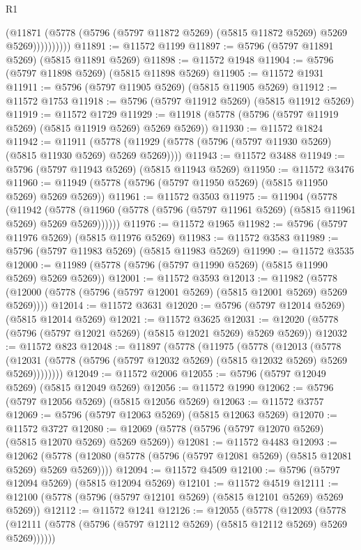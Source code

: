 \begin{lexlean}{R1}
\begin{coremodule}
                  (@11871
                    (@5778 (@5796 (@5797 @11872 @5269) (@5815 @11872 @5269) @5269 @5269))))))))))
@11891 := @11572 @1199
@11897 := @5796 (@5797 @11891 @5269) (@5815 @11891 @5269)
@11898 := @11572 @1948
@11904 := @5796 (@5797 @11898 @5269) (@5815 @11898 @5269)
@11905 := @11572 @1931
@11911 := @5796 (@5797 @11905 @5269) (@5815 @11905 @5269)
@11912 := @11572 @1753
@11918 := @5796 (@5797 @11912 @5269) (@5815 @11912 @5269)
@11919 := @11572 @1729
@11929 := @11918 (@5778 (@5796 (@5797 @11919 @5269) (@5815 @11919 @5269) @5269 @5269))
@11930 := @11572 @1824
@11942 := @11911
    (@5778 (@11929 (@5778 (@5796 (@5797 @11930 @5269) (@5815 @11930 @5269) @5269 @5269))))
@11943 := @11572 @3488
@11949 := @5796 (@5797 @11943 @5269) (@5815 @11943 @5269)
@11950 := @11572 @3476
@11960 := @11949 (@5778 (@5796 (@5797 @11950 @5269) (@5815 @11950 @5269) @5269 @5269))
@11961 := @11572 @3503
@11975 := @11904
    (@5778
      (@11942
        (@5778 (@11960 (@5778 (@5796 (@5797 @11961 @5269) (@5815 @11961 @5269) @5269 @5269))))))
@11976 := @11572 @1965
@11982 := @5796 (@5797 @11976 @5269) (@5815 @11976 @5269)
@11983 := @11572 @3583
@11989 := @5796 (@5797 @11983 @5269) (@5815 @11983 @5269)
@11990 := @11572 @3535
@12000 := @11989 (@5778 (@5796 (@5797 @11990 @5269) (@5815 @11990 @5269) @5269 @5269))
@12001 := @11572 @3593
@12013 := @11982
    (@5778 (@12000 (@5778 (@5796 (@5797 @12001 @5269) (@5815 @12001 @5269) @5269 @5269))))
@12014 := @11572 @3631
@12020 := @5796 (@5797 @12014 @5269) (@5815 @12014 @5269)
@12021 := @11572 @3625
@12031 := @12020 (@5778 (@5796 (@5797 @12021 @5269) (@5815 @12021 @5269) @5269 @5269))
@12032 := @11572 @823
@12048 := @11897
    (@5778
      (@11975
        (@5778
          (@12013
            (@5778
              (@12031 (@5778 (@5796 (@5797 @12032 @5269) (@5815 @12032 @5269) @5269 @5269))))))))
@12049 := @11572 @2006
@12055 := @5796 (@5797 @12049 @5269) (@5815 @12049 @5269)
@12056 := @11572 @1990
@12062 := @5796 (@5797 @12056 @5269) (@5815 @12056 @5269)
@12063 := @11572 @3757
@12069 := @5796 (@5797 @12063 @5269) (@5815 @12063 @5269)
@12070 := @11572 @3727
@12080 := @12069 (@5778 (@5796 (@5797 @12070 @5269) (@5815 @12070 @5269) @5269 @5269))
@12081 := @11572 @4483
@12093 := @12062
    (@5778 (@12080 (@5778 (@5796 (@5797 @12081 @5269) (@5815 @12081 @5269) @5269 @5269))))
@12094 := @11572 @4509
@12100 := @5796 (@5797 @12094 @5269) (@5815 @12094 @5269)
@12101 := @11572 @4519
@12111 := @12100 (@5778 (@5796 (@5797 @12101 @5269) (@5815 @12101 @5269) @5269 @5269))
@12112 := @11572 @1241
@12126 := @12055
    (@5778
      (@12093
        (@5778 (@12111 (@5778 (@5796 (@5797 @12112 @5269) (@5815 @12112 @5269) @5269 @5269))))))

\end{coremodule}
\end{lexlean}
